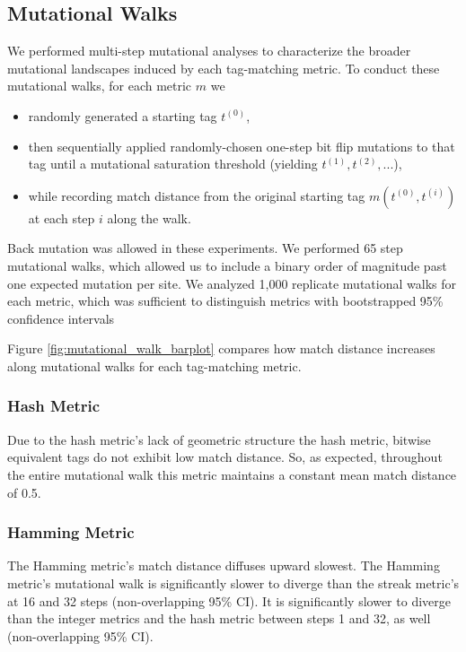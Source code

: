 \subsection{Mutational Walks} \label{sec:mutational_walks}



We performed multi-step mutational analyses to characterize the broader mutational landscapes induced by each tag-matching metric.
To conduct these mutational walks, for each metric $m$ we
\begin{itemize}
    \item randomly generated a starting tag $t^{(0)}$,
    \item then sequentially applied randomly-chosen one-step bit flip mutations to that tag until a mutational saturation threshold (yielding $t^{(1)}, t^{(2)}, ...$),
    \item while recording match distance from the original starting tag $m(t^{(0)}, t^{(i)})$ at each step $i$ along the walk.
\end{itemize}
Back mutation was allowed in these experiments.
We performed 65 step mutational walks, which allowed us to include a binary order of magnitude past one expected mutation per site.
We analyzed 1,000 replicate mutational walks for each metric, which was sufficient to distinguish metrics with bootstrapped 95\% confidence intervals

Figure \ref{fig:mutational_walk_barplot} compares how match distance increases along mutational walks for each tag-matching metric.

\subsubsection{Hash Metric}

Due to the hash metric's lack of geometric structure the hash metric, bitwise equivalent tags do not exhibit low match distance.
So, as expected, throughout the entire mutational walk this metric maintains a constant mean match distance of 0.5.

\subsubsection{Hamming Metric}

The Hamming metric's match distance diffuses upward slowest.
The Hamming metric's mutational walk is significantly slower to diverge than the streak metric's at 16 and 32 steps (non-overlapping 95\% CI).
It is significantly slower to diverge than the integer metrics and the hash metric between steps 1 and 32, as well (non-overlapping 95\% CI).

